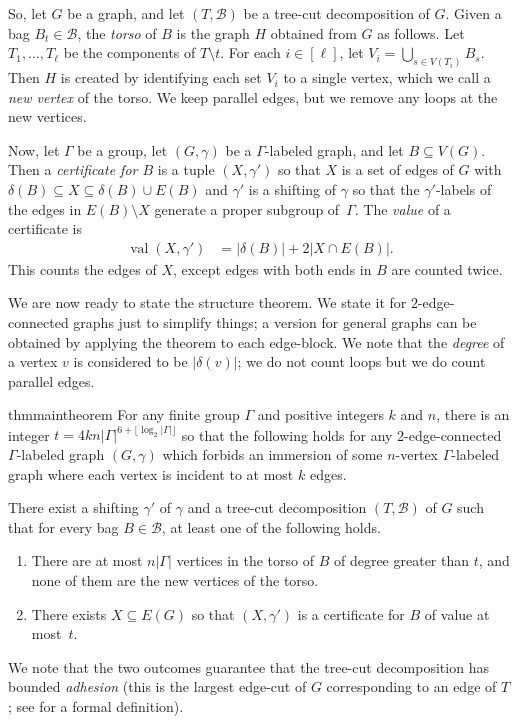 \documentclass[11pt]{article}
\theoremstyle{definition}
\DeclareMathOperator{\val}{val}
\begin{document}
So, let $G$ be a graph, and let $(T, \mathscr{B})$ be a tree-cut decomposition of $G$. Given a bag $B_t \in \mathscr{B}$, the \textit{torso} of $B$ is the graph $H$ obtained from $G$ as follows. Let $T_1, \dots, T_\ell$ be the components of $T \setminus t$. For each $i \in [\ell]$, let $V_i = \bigcup_{s \in V(T_i)} B_{s}$. Then $H$ is created by identifying each set $V_i$ to a single vertex, which we call a \emph{new vertex} of the torso. We keep parallel edges, but we remove any loops at the new vertices. 

Now, let $\Gamma$ be a group, let $(G, \gamma)$ be a $\Gamma$-labeled graph, and let $B\subseteq V(G)$. Then a \textit{certificate for $B$} is a tuple $(X,\gamma')$ so that $X$ is a set of edges of $G$ with $\delta(B) \subseteq X \subseteq \delta(B) \cup E(B)$ and $\gamma'$ is a shifting of $\gamma$ so that the $\gamma'$-labels of the edges in $E(B)\setminus X$ generate a proper subgroup of~$\Gamma$. The \emph{value} of a certificate is
\begin{align*}
    \val(X,\gamma') &= |\delta(B)| + 2|X \cap E(B)|.
\end{align*}This counts the edges of $X$, except edges with both ends in $B$ are counted twice. 

We are now ready to state the structure theorem. We state it for $2$-edge-connected graphs just to simplify things; a version for general graphs can be obtained by applying the theorem to each edge-block. We note that the \emph{degree} of a vertex $v$ is considered to be $|\delta(v)|$; we do not count loops but we do count parallel edges.

\begin{restatable}{thm}{maintheorem}
\label{thm:MainStructureThm}
    For any finite group $\Gamma$ and positive integers $k$ and $n$, there is an integer $t=4kn|\Gamma|^{6 + \lfloor\log_2|\Gamma|\rfloor}$ so that the following holds for any 2-edge-connected $\Gamma$-labeled graph $(G, \gamma)$ which forbids an immersion of some $n$-vertex $\Gamma$-labeled graph where each vertex is incident to at most $k$ edges. 
    
    There exist a shifting $\gamma'$ of $\gamma$ and a tree-cut decomposition $(T, \mathscr{B})$ of $G$ such that for every bag $B \in \mathscr{B}$, at least one of the following holds.
    \begin{enumerate}
        \item There are at most $n|\Gamma|$ vertices in the torso of $B$ of degree greater than $t$, and none of them are the new vertices of the torso.
        \item There exists $X \subseteq E(G)$ so that $(X,\gamma')$ is a certificate for $B$ of value at most~$t$.
    \end{enumerate}
\end{restatable}
\noindent We note that the two outcomes guarantee that the tree-cut decomposition has bounded \emph{adhesion} (this is the largest edge-cut of $G$ corresponding to an edge of $T$; see \cite{WOLLAN2015} for a formal definition).
\end{document}
